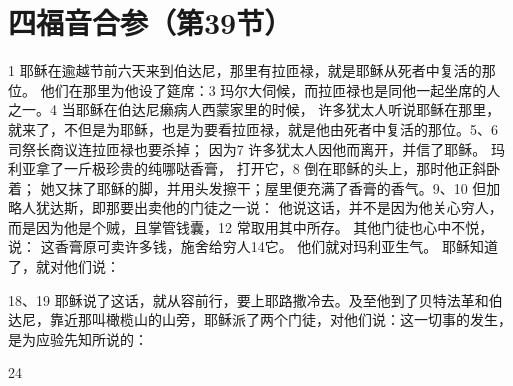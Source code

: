 
\section{四福音合参（第39节）}

1  耶稣在逾越节前六天来到伯达尼，那里有拉匝禄，就是耶稣从死者中复活的那位。 他们在那里为他设了筵席：3 玛尔大伺候，而拉匝禄也是同他一起坐席的人之一。4  当耶稣在伯达尼癞病人西蒙家里的时候， 许多犹太人听说耶稣在那里，就来了，不但是为耶稣，也是为要看拉匝禄，就是他由死者中复活的那位。5、6  司祭长商议连拉匝禄也要杀掉； 因为7 许多犹太人因他而离开，并信了耶稣。 玛利亚拿了一斤极珍贵的纯哪哒香膏， 打开它，8 倒在耶稣的头上，那时他正斜卧着； 她又抹了耶稣的脚，并用头发擦干；屋里便充满了香膏的香气。9、10  但加略人犹达斯，即那要出卖他的门徒之一说： 他说这话，并不是因为他关心穷人，而是因为他是个贼，且掌管钱囊，12 常取用其中所存。 其他门徒也心中不悦，说： 这香膏原可卖许多钱，施舍给穷人14它。 他们就对玛利亚生气。 耶稣知道了，就对他们说：\par

18、19   耶稣说了这话，就从容前行，要上耶路撒冷去。及至他到了贝特法革和伯达尼，靠近那叫橄榄山的山旁，耶稣派了两个门徒，对他们说：这一切事的发生，是为应验先知所说的：\par

24  \par


